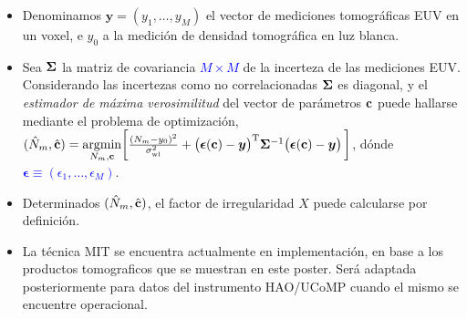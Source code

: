 \documentclass[a1,portrait,final]{baposter_old}
\def\by{{\bf y}}
\def\bSigma{{\bf \Sigma}}
\def\azul#1{\textcolor{blue}{\bf\sf #1}}
\def\bc{{\bf c}}
\def\by{\boldsymbol{y}}
\def\bepsilon{\boldsymbol{\epsilon}}
\def\bSigma{{\bf \Sigma}}
\def\rT{\mathrm{T}}
\begin{document}
\begin{poster}
{{\begin{itemize}
\item Denominamos $\by = ( y_1, \dots , y_M)$ el vector de mediciones tomográficas EUV en un voxel, e $y_0$ a la medición de densidad tomográfica en luz blanca.

\item Sea \azul{$\bSigma$} la matriz de covariancia \azul{$M \times M$} de la incerteza de las mediciones EUV. Considerando las incertezas como no correlacionadas \azul{$\bSigma$} es diagonal, y el \emph{estimador de máxima verosimilitud} del vector de parámetros \azul{$\bc$} puede hallarse mediante el problema de optimización,\\ 
\azul{$(\hat{N}_m, \hat{\bc}) = \underset{N_m, \bc}{\mathrm{argmin}} \bigg[  \frac{ (N_m - y_0)^2}{\sigma^2_\mathrm{wl}} +  \big(\bepsilon(\bc) - \by \big)^\rT \bSigma^{-1} \big( \bepsilon(\bc) - \by \big) \, \bigg]$},
dónde \azul{$\bepsilon \equiv (\epsilon_1, \dots, \epsilon_M)$}.

\item Determinados \azul{$(\hat{N}_m, \hat{\bc})$}, el factor de irregularidad $X$ puede calcularse por definición.

\item La técnica MIT se encuentra actualmente en implementación, en base a los productos tomograficos que se muestran en este poster. Será adaptada posteriormente para datos del instrumento HAO/UCoMP cuando el mismo se encuentre operacional.

\end{itemize}
}
}

\end{poster}
\end{document}

